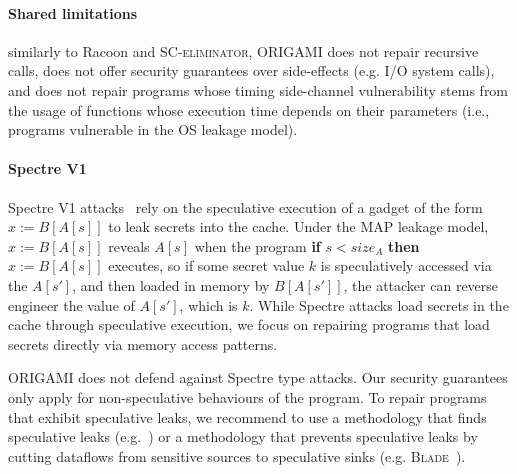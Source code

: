 {\paragraph*{Shared limitations} similarly to Racoon and \textsc{SC-eliminator}, ORIGAMI does not repair recursive calls, does not offer security guarantees over side-effects (e.g. I/O system calls), and does not repair programs whose timing side-channel vulnerability stems from the usage of functions whose execution time depends on their parameters (i.e., programs vulnerable in the OS leakage model). 

\paragraph*{Spectre V1} Spectre V1 attacks~\cite{Spectre} rely on the speculative execution of a gadget of the form $x:=B[A[s]]$ to leak secrets into the cache. Under the MAP leakage model, $x:=B[A[s]]$ reveals $A[s]$ when the program \textbf{if} $s<size_A$ \textbf{then} $x:=B[A[s]]$ executes, so if some secret value $k$ is speculatively accessed via the $A[s']$, and then loaded in memory by $B[A[s']]$, the attacker can reverse engineer the value of $A[s']$, which is $k$. While Spectre attacks load secrets in the cache through speculative execution, we focus on repairing programs that load secrets directly via memory access patterns. 

ORIGAMI does not defend against Spectre type attacks. Our security guarantees only apply for non-speculative behaviours of the program. To repair programs that exhibit speculative leaks, we recommend to use a methodology that finds speculative leaks (e.g.~\cite{pitchfork}) or a methodology that prevents speculative leaks by cutting dataflows from sensitive sources to speculative sinks (e.g. \textsc{Blade}~\cite{Blade}).



}
